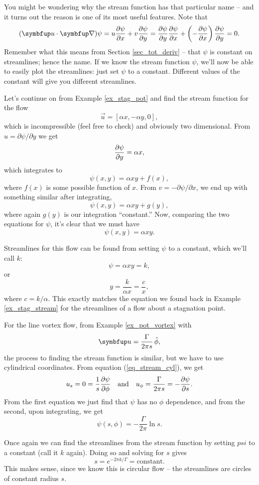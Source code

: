 You might be wondering why the stream function has that particular name -- and it turns out the reason is one of its most useful features.  Note that
\[
(\vec{u} \cdot \grad ) \psi = u\dfdx{\psi}{x} + v\dfdx{\psi}{y} = \dfdx{\psi}{y} \dfdx{\psi}{x} + \left( -\dfdx{\psi}{x} \right) \dfdx{\psi}{y} = 0.
\]
Remember what this means from Section \ref{sec_tot_deriv} -- that $\psi$ is constant on streamlines; hence the name.  If we know the stream function $\psi$, we'll now be able to easily plot the streamlines:  just set $\psi$ to a constant.  Different values of the constant will give you different streamlines.


\begin{example}
\label{ex_stag_psi}
Let's continue on from Example \ref{ex_stag_pot} and find the stream function for the flow
\[
\vec{u} = [\alpha x, -\alpha y, 0],
\]
which is incompressible (feel free to check) and obviously two dimensional.  From $u = \partial \psi / \partial y$ we get
\[
\frac{\partial {\psi}}{\partial {y}} = \alpha x,
\]
which integrates to 
\[
\psi(x, y) = \alpha x y + f(x),
\]
where $f(x)$ is some possible function of $x$.  From $v = -\partial \psi / \partial x$, we end up with something similar after integrating,
\[
\psi(x, y) = \alpha x y + g(y),
\]
where again $g(y)$ is our integration ``constant.''  Now, comparing the two equations for $\psi$, it's clear that we must have
\begin{equation}
\psi(x, y) = \alpha x y.
\end{equation}

Streamlines for this flow can be found from setting $\psi$ to a constant, which we'll call $k$:
\[
\psi = \alpha x y = k,
\]
or
\[
y = \frac{k}{\alpha x} = \frac{c}{x},
\]
where $c = k/\alpha$.  This exactly matches the equation we found back in Example \ref{ex_stag_stream} for the streamlines of a flow about a stagnation point.
\end{example}



\begin{example}
\label{ex_vortex_psi}
For the line vortex flow, from Example \ref{ex_pot_vortex} with
\[
\uu = \frac{\Gamma}{2\pi s} \, \hat{\phi},
\]
the process to finding the stream function is similar, but we have to use cylindrical coordinates.  From equation (\ref{eq_stream_cyl}), we get
\[
u_s = 0 = \frac{1}{s} \frac{\partial {\psi}}{\partial {\phi}} \quad \text{and} \quad u_\phi = \frac{\Gamma}{2\pi s} = -\frac{\partial {\psi}}{\partial {s}}.
\]
From the first equation we just find that $\psi$ has no $\phi$ dependence, and from the second, upon integrating, we get
\[
\psi(s, \phi) = -\frac{\Gamma}{2\pi} \ln s.
\]

Once again we can find the streamlines from the stream function by setting $psi$ to a constant (call it $k$ again).  Doing so and solving for $s$ gives
\[
s = e^{-2\pi k / \Gamma} = \text{constant}.
\]
This makes sense, since we know this is circular flow -- the streamlines are circles of constant radius $s$.
\end{example}

